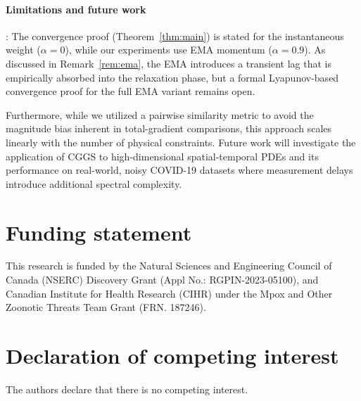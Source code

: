 \documentclass[11pt]{article}
\begin{document}
\paragraph{Limitations and future work}: 
The convergence proof (Theorem~\ref{thm:main}) is stated for the instantaneous weight ($\alpha = 0$), while our experiments use EMA momentum ($\alpha = 0.9$). As discussed in Remark~\ref{rem:ema}, the EMA introduces a transient lag that is empirically absorbed into the relaxation phase, but a formal Lyapunov-based convergence proof for the full EMA variant remains open.

Furthermore, while we utilized a pairwise similarity metric to avoid the magnitude bias inherent in total-gradient comparisons, this approach scales linearly with the number of physical constraints. Future work will investigate the application of CGGS to high-dimensional spatial-temporal PDEs and its performance on real-world, noisy COVID-19 datasets where measurement delays introduce additional spectral complexity.

\section*{Funding statement}
	This research is funded by the Natural Sciences and Engineering Council of Canada (NSERC) Discovery Grant (Appl No.: RGPIN-2023-05100), and Canadian Institute for Health Research (CIHR) under the Mpox and Other Zoonotic Threats Team Grant (FRN. 187246).
	
	\section*{Declaration of competing interest}
	The authors declare that there is no competing interest.
	



\end{document}
